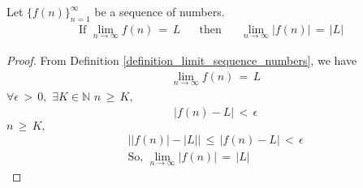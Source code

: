 \begin{theorem} 
Let $\{f(n)\}_{n = 1}^{\infty}$ be a sequence of numbers.
\begin{align*}
    \text{If} \hspace{4pt} \lim_{n \longrightarrow \infty} f(n) \hspace{2pt} = \hspace{2pt} L \hspace{20pt} \text{then} \hspace{20pt} \lim_{n \longrightarrow \infty} \lvert f(n) \rvert \hspace{2pt} = \hspace{2pt} \lvert L \rvert
\end{align*}
\begin{proof}
    From Definition \ref{definition_limit_sequence_numbers}, we have
    \begin{align*}
        &\lim_{n \longrightarrow \infty} f(n) \hspace{2pt} = \hspace{2pt} L 
    \end{align*}    
     $\forall \epsilon \hspace{2pt} > \hspace{2pt} 0, \hspace{4pt} \exists K \in \mathbb{N}$  $n \hspace{2pt} \geq \hspace{2pt} K, \hspace{4pt}$ 
    \begin{align*}
        &\lvert f(n) - L \rvert \hspace{2pt} < \hspace{2pt} \epsilon
    \end{align*}
     $n \hspace{2pt} \geq \hspace{2pt} K,$ 
    \begin{align*}
        &\Big\lvert \lvert f(n) \rvert - \lvert L \rvert \Big\rvert \hspace{2pt} \leq \hspace{2pt} \lvert f(n) - L \rvert \hspace{2pt} < \hspace{2pt} \epsilon \\[2ex]
        &\text{So,} \hspace{4pt} \lim_{n \longrightarrow \infty} \lvert f(n) \rvert \hspace{2pt} = \hspace{2pt} \lvert L \rvert
    \end{align*}
\end{proof}
\end{theorem}



